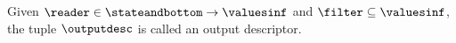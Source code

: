\begin{definition}
  Given $\reader\in\stateandbottom\to\valuesinf$ and $\filter\subseteq\valuesinf$, the tuple $\outputdesc$ is called an \textup{output descriptor}.
\end{definition}
